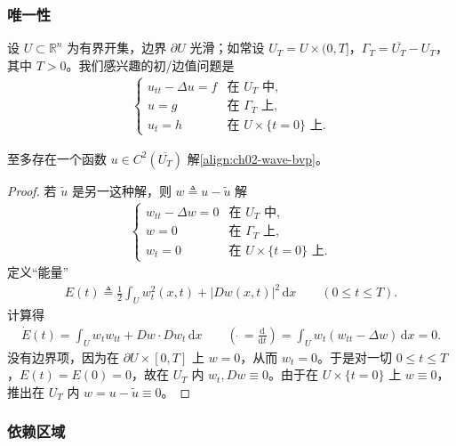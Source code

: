 \documentclass[../../main.tex]{subfiles}
\begin{document}
\subsubsection{唯一性}

设 $U\subset\mathbb{R}^n$ 为有界开集，边界 $\partial U$ 光滑；如常设 $U_T=U\times(0,T]$，$\Gamma_T=\overline{U_T}-U_T$，其中 $T>0$。我们感兴趣的初/边值问题是
\begin{align}\label{align:ch02-wave-bvp}
\begin{cases}
u_{tt}-\Delta u=f & \text{在 }U_T\text{ 中},\\
u=g & \text{在 }\Gamma_T\text{ 上},\\
u_t=h & \text{在 }U\times\{t=0\}\text{ 上}.
\end{cases}
\end{align}

\begin{theorem}[波动方程的唯一性]\label{theorem:ch02-wave-uniqueness}至多存在一个函数 $u\in C^2(\overline{U_T})$ 解\eqref{align:ch02-wave-bvp}。
\end{theorem}

\begin{proof}
若 $\widetilde{u}$ 是另一这种解，则 $w\triangleq u-\widetilde{u}$ 解
\begin{align*}
\begin{cases}
w_{tt}-\Delta w=0 & \text{在 }U_T\text{ 中},\\
w=0 & \text{在 }\Gamma_T\text{ 上},\\
w_t=0 & \text{在 }U\times\{t=0\}\text{ 上}.
\end{cases}
\end{align*}
定义``能量''
\begin{align*}
E(t)\triangleq\frac{1}{2}\int_U w_t^2(x,t)+|Dw(x,t)|^2\,\mathrm{d}x \qquad (0\leqslant t\leqslant T).
\end{align*}
计算得
\begin{align*}
\dot{E}(t)=\int_U w_t w_{tt}+Dw\cdot Dw_t\,\mathrm{d}x \qquad \left(\dot{\ }=\frac{\mathrm{d}}{\mathrm{d}t}\right)
=\int_U w_t(w_{tt}-\Delta w)\,\mathrm{d}x=0.
\end{align*}
没有边界项，因为在 $\partial U\times[0,T]$ 上 $w=0$，从而 $w_t=0$。于是对一切 $0\leqslant t\leqslant T$，$E(t)=E(0)=0$，故在 $U_T$ 内 $w_t,Dw\equiv 0$。由于在 $U\times\{t=0\}$ 上 $w\equiv 0$，推出在 $U_T$ 内 $w=u-\widetilde{u}\equiv 0$。
\end{proof}

\subsubsection{依赖区域}
\end{document}
